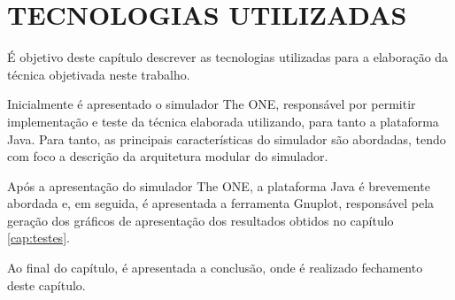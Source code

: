 \chapter{TECNOLOGIAS UTILIZADAS} \label{cap:theONE}

É objetivo deste capítulo descrever as tecnologias utilizadas para a elaboração da técnica objetivada neste trabalho.

Inicialmente é apresentado o simulador The ONE, responsável por permitir implementação e teste da técnica elaborada utilizando, para tanto a plataforma Java. Para tanto, as principais características do simulador são abordadas, tendo com foco a descrição da arquitetura modular do simulador.

Após a apresentação do simulador The ONE, a plataforma Java é brevemente abordada e, em seguida, é apresentada a ferramenta Gnuplot, responsável pela geração dos gráficos de apresentação dos resultados obtidos no capítulo \ref{cap:testes}.

Ao final do capítulo, é apresentada a conclusão, onde é realizado fechamento deste capítulo.










